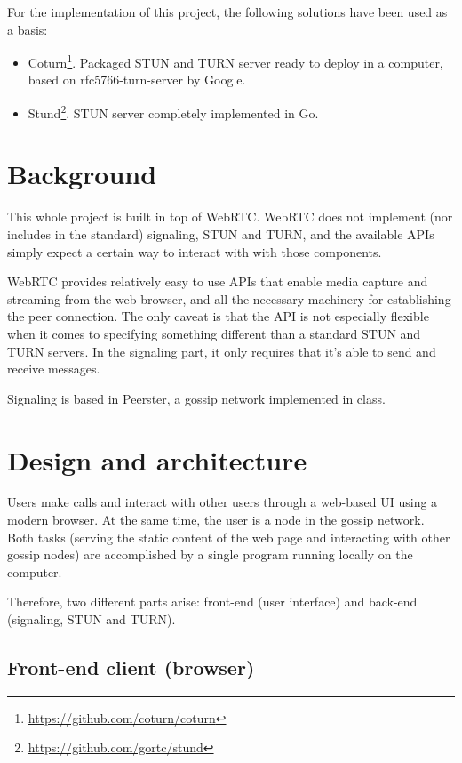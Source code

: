 \documentclass[paper=a4, fontsize=11pt]{scrartcl} %
\numberwithin{equation}{section} %
\numberwithin{figure}{section} %
\numberwithin{table}{section} %
\begin{document}
For the implementation of this project, the following solutions have been used as a basis:

\begin{itemize}
	\item Coturn\footnote{\url{https://github.com/coturn/coturn}}. Packaged STUN and TURN server ready to deploy in a computer, based on rfc5766-turn-server by Google.
	\item Stund\footnote{\url{https://github.com/gortc/stund}}. STUN server completely implemented in Go.
\end{itemize}

\section{Background}

This whole project is built in top of WebRTC. WebRTC does not implement (nor includes in the standard) signaling, STUN and TURN, and the available APIs simply expect a certain way to interact with with those components. 

WebRTC provides relatively easy to use APIs that enable media capture and streaming from the web browser, and all the necessary machinery for establishing the peer connection. The only caveat is that the API is not especially flexible when it comes to specifying something different than a standard STUN and TURN servers. In the signaling part, it only requires that it's able to send and receive messages.

Signaling is based in Peerster, a gossip network implemented in class.

\section{Design and architecture}

Users make calls and interact with other users through a web-based UI using a modern browser. At the same time, the user is a node in the gossip network. Both tasks (serving the static content of the web page and interacting with other gossip nodes) are accomplished by a single program running locally on the computer.

Therefore, two different parts arise: front-end (user interface) and back-end (signaling, STUN and TURN).

\subsection{Front-end client (browser)}
\end{document}

